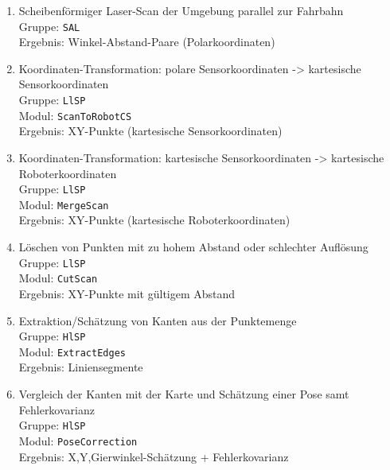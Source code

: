 \begin{enumerate}
  \item Scheibenförmiger Laser-Scan der Umgebung parallel zur Fahrbahn\\
    	Gruppe: \lstinline{SAL}\\
    	Ergebnis: Winkel-Abstand-Paare (Polarkoordinaten)\\
  \item Koordinaten-Transformation: polare Sensorkoordinaten -> kartesische
  		Sensorkoordinaten\\
  		Gruppe: \lstinline{LlSP}\\
    	Modul: \lstinline{ScanToRobotCS}\\
    	Ergebnis: XY-Punkte (kartesische Sensorkoordinaten)\\
  \item Koordinaten-Transformation: kartesische Sensorkoordinaten -> kartesische
  		Roboterkoordinaten\\ 
  		Gruppe: \lstinline{LlSP}\\
  		Modul: \lstinline{MergeScan}\\
  		Ergebnis: XY-Punkte (kartesische Roboterkoordinaten)\\
  \item Löschen von Punkten mit zu hohem Abstand oder schlechter Auflösung\\
    	Gruppe: \lstinline{LlSP}\\
    	Modul: \lstinline{CutScan}\\
    	Ergebnis: XY-Punkte mit gültigem Abstand\\
  \item Extraktion/Schätzung von Kanten aus der Punktemenge\\
    	Gruppe: \lstinline{HlSP}\\
    	Modul: \lstinline{ExtractEdges}\\
    	Ergebnis: Liniensegmente\\
  \item Vergleich der Kanten mit der Karte und Schätzung einer Pose samt
  		Fehlerkovarianz\\ 
  		Gruppe: \lstinline{HlSP}\\
    	Modul: \lstinline{PoseCorrection}\\
    	Ergebnis: X,Y,Gierwinkel-Schätzung + Fehlerkovarianz\\
\end{enumerate}

